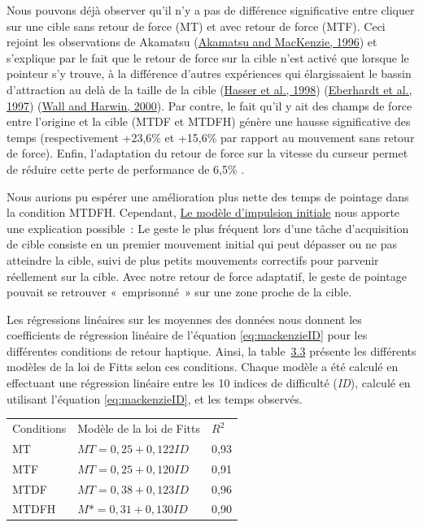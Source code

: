 \documentclass[
]{book}
\begin{document}
Nous pouvons déjà observer qu'il n'y a pas de différence significative
entre cliquer sur une cible sans retour de force (MT) et avec retour de force
(MTF). Ceci rejoint les observations de Akamatsu (\protect\hyperlink{ref-akamatsu1996movement}{Akamatsu and MacKenzie, 1996}) et
s'explique par le fait que le retour de force sur la cible n'est activé que
lorsque le pointeur s'y trouve, à la différence d'autres expériences qui
élargissaient le bassin d'attraction au delà de la taille de la cible
(\protect\hyperlink{ref-hasser1998user}{Hasser et al., 1998}) (\protect\hyperlink{ref-eberhardt1997force}{Eberhardt et al., 1997}) (\protect\hyperlink{ref-wall2000quantification}{Wall and Harwin, 2000}). Par
contre, le fait qu'il y ait des champs de force entre l'origine et la cible
(MTDF et MTDFH) génère une hausse significative des temps (respectivement
+23,6\% et +15,6\% par rapport au mouvement sans retour de force). Enfin,
l'adaptation du retour de force sur la vitesse du curseur permet de réduire
cette perte de performance de 6,5\% .

Nous aurions pu espérer une amélioration plus nette des temps de pointage
dans la condition MTDFH. Cependant, \protect\hyperlink{le-moduxe8le-dimpulsion-initiale}{Le modèle d'impulsion initiale} nous
apporte une explication possible~: Le geste le plus fréquent lors d'une tâche
d'acquisition de cible consiste en un premier mouvement initial qui peut
dépasser ou ne pas atteindre la cible, suivi de plus petits mouvements
correctifs pour parvenir réellement sur la cible. Avec notre retour de force
adaptatif, le geste de pointage pouvait se retrouver «~emprisonné~» sur une
zone proche de la cible.

Les régressions linéaires sur les moyennes des données nous donnent les
coefficients de régression linéaire de l'équation \eqref{eq:mackenzieID} pour
les différentes conditions de retour haptique. Ainsi, la table~\protect\hyperlink{table2}{3.3}
présente les différents modèles de la loi de Fitts selon ces conditions.
Chaque modèle a été calculé en effectuant une régression linéaire entre les
10 indices de difficulté (\emph{ID}), calculé en utilisant l'équation
\eqref{eq:mackenzieID}, et les temps observés.

\begin{longtable}[]{@{}lll@{}}
\toprule()
\endhead
Conditions & Modèle de la loi de Fitts & \(R^2\) \\
MT & \(MT=0,25+0,122ID\) & 0,93 \\
MTF & \(MT=0,25+0,120ID\) & 0,91 \\
MTDF & \(MT=0,38+0,123ID\) & 0,96 \\
MTDFH & \(M*=0,31+0,130ID\) & 0,90 \\
\bottomrule()
\end{longtable}
\end{document}
